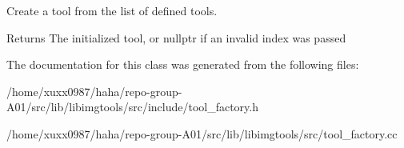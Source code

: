 Create a tool from the list of defined tools. 

\begin{DoxyReturn}{Returns}
The initialized tool, or nullptr if an invalid index was passed 
\end{DoxyReturn}


The documentation for this class was generated from the following files\+:\begin{DoxyCompactItemize}
\item 
/home/xuxx0987/haha/repo-\/group-\/\+A01/src/lib/libimgtools/src/include/tool\+\_\+factory.\+h\item 
/home/xuxx0987/haha/repo-\/group-\/\+A01/src/lib/libimgtools/src/tool\+\_\+factory.\+cc\end{DoxyCompactItemize}
